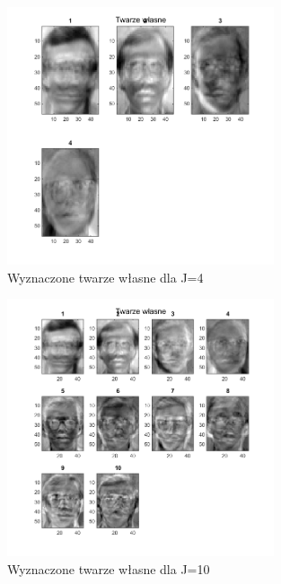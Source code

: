\documentclass[11pt, a4paper]{article}
\begin{document}
\begin{figure}[H]
	\centering
	\includegraphics[width=0.7\textwidth]{./assets/ilustracja_zad2_eigen_j4.png}
	\caption{Wyznaczone twarze własne dla J=4}
	\label{fig:ilustracja_zad2_eigen_j4}
\end{figure}

\begin{figure}[H]
	\centering
	\includegraphics[width=0.7\textwidth]{./assets/ilustracja_zad2_eigen_j10.png}
	\caption{Wyznaczone twarze własne dla J=10}
	\label{fig:ilustracja_zad2_eigen_j10}
\end{figure}
\end{document}

